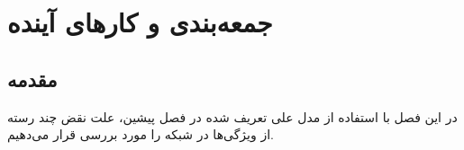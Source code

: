\chapter{جمعه‌بندی و کار‌های آینده}
\section{مقدمه}
در این فصل با استفاده از مدل علی تعریف شده در فصل پیشین، علت نقض چند رسته از ویژگی‌ها در شبکه را مورد بررسی قرار می‌دهیم.

